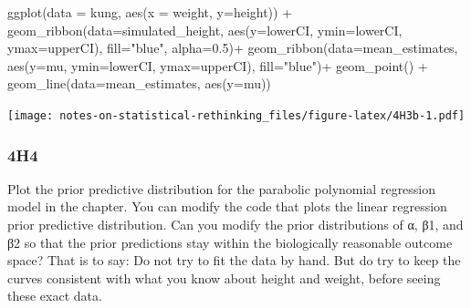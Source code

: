 \documentclass[
]{book}
\newenvironment{Shaded}{\begin{snugshade}}{\end{snugshade}}
\newcommand{\AttributeTok}[1]{\textcolor[rgb]{0.77,0.63,0.00}{#1}}
\newcommand{\FloatTok}[1]{\textcolor[rgb]{0.00,0.00,0.81}{#1}}
\newcommand{\FunctionTok}[1]{\textcolor[rgb]{0.00,0.00,0.00}{#1}}
\newcommand{\NormalTok}[1]{#1}
\newcommand{\SpecialCharTok}[1]{\textcolor[rgb]{0.00,0.00,0.00}{#1}}
\newcommand{\StringTok}[1]{\textcolor[rgb]{0.31,0.60,0.02}{#1}}
\begin{document}
\begin{Shaded}
\begin{Highlighting}[]
\FunctionTok{ggplot}\NormalTok{(}\AttributeTok{data =}\NormalTok{ kung, }\FunctionTok{aes}\NormalTok{(}\AttributeTok{x =}\NormalTok{ weight, }\AttributeTok{y=}\NormalTok{height)) }\SpecialCharTok{+} 
  \FunctionTok{geom\_ribbon}\NormalTok{(}\AttributeTok{data=}\NormalTok{simulated\_height, }\FunctionTok{aes}\NormalTok{(}\AttributeTok{y=}\NormalTok{lowerCI, }\AttributeTok{ymin=}\NormalTok{lowerCI, }\AttributeTok{ymax=}\NormalTok{upperCI), }\AttributeTok{fill=}\StringTok{"blue"}\NormalTok{, }\AttributeTok{alpha=}\FloatTok{0.5}\NormalTok{)}\SpecialCharTok{+}
  \FunctionTok{geom\_ribbon}\NormalTok{(}\AttributeTok{data=}\NormalTok{mean\_estimates, }\FunctionTok{aes}\NormalTok{(}\AttributeTok{y=}\NormalTok{mu, }\AttributeTok{ymin=}\NormalTok{lowerCI, }\AttributeTok{ymax=}\NormalTok{upperCI), }\AttributeTok{fill=}\StringTok{"blue"}\NormalTok{)}\SpecialCharTok{+}
  \FunctionTok{geom\_point}\NormalTok{() }\SpecialCharTok{+} 
  \FunctionTok{geom\_line}\NormalTok{(}\AttributeTok{data=}\NormalTok{mean\_estimates, }\FunctionTok{aes}\NormalTok{(}\AttributeTok{y=}\NormalTok{mu))}
\end{Highlighting}
\end{Shaded}

\texttt{[image: notes-on-statistical-rethinking\_files/figure-latex/4H3b-1.pdf]}

\hypertarget{h4-2}{%
\subsubsection*{4H4}\label{h4-2}}

Plot the prior predictive distribution for the parabolic polynomial regression model in the chapter. You can modify the code that plots the linear regression prior predictive distribution. Can you modify the prior distributions of α, β1, and β2 so that the prior predictions stay within the biologically reasonable outcome space? That is to say: Do not try to fit the data by hand. But do try to keep the curves consistent with what you know about height and weight, before seeing these exact data.
\end{document}
